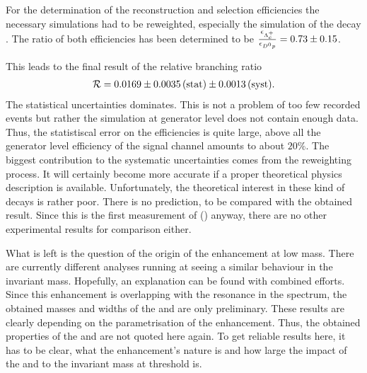 For the determination of the reconstruction and selection efficiencies the necessary simulations had to be reweighted, especially the simulation of the decay \LbToDpmunuX.
The ratio of both efficiencies has been determined to be $\frac{\epsilon_{{{\Lambda}^+_{c}}}}{\epsilon_{{{D}^0}{p}}} = 0.73 \pm 0.15$.

This leads to the final result of the relative branching ratio
\begin{align*}
    \mathcal{R} = 0.0169 \pm 0.0035\mathrm{\,(stat)} \pm 0.0013\mathrm{\,(syst)}.
\end{align*}
The statistical uncertainties dominates.
This is not a problem of too few recorded events but rather the \LbToDpmunuX simulation at generator level does not contain enough data.
Thus, the statistiscal error on the efficiencies is quite large, above all the generator level efficiency \effGenDp of the \LbToDpmunuX signal channel amounts to about $20\%$.
The biggest contribution to the systematic uncertainties comes from the reweighting process.
It will certainly become more accurate if a proper theoretical physics description is available.
Unfortunately, the theoretical interest in these kind of decays is rather poor.
There is no prediction, to be compared with the obtained result.
Since this is the first measurement of \BR(\LbToDpmunuX) anyway, there are no other experimental results for comparison either.

What is left is the question of the origin of the enhancement at low \Dz\proton mass.
There are currently different analyses running at \lhcb seeing a similar behaviour in the invariant \Dz\proton mass.
Hopefully, an explanation can be found with combined efforts.
Since this enhancement is overlapping with the \LcResI resonance in the \Dz\proton spectrum, the obtained masses and widths of the \LcResI and \LcResII are only preliminary.
These results are clearly depending on the parametrisation of the enhancement.
Thus, the obtained properties of the \LcResI and \LcResII are not quoted here again.
To get reliable results here, it has to be clear, what the enhancement's nature is and how large the impact of the  and  to the invariant \Dz\proton mass at threshold is.
